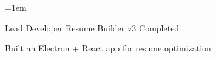 \emergencystretch=1em   %
\sloppy                 %

\begin{cventries}

          \cventry
            {Lead Developer} %
            {Resume Builder v3} %
            {} %
            {Completed} %
            {
              \begin{cvitems} %
              \item {Built an Electron + React app for resume optimization}
              \end{cvitems}
            }
\end{cventries}
